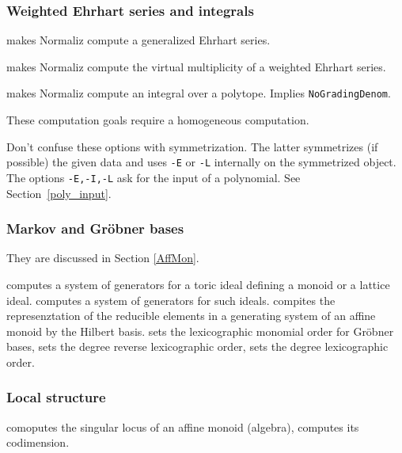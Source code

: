 \subsubsection{Weighted Ehrhart series and integrals}

\begin{itemize}
	
	\itemtt[WeightedEhrhartSeries, -E] makes Normaliz compute a generalized Ehrhart series.
	
	\itemtt[VirtualMultiplicity, -L] makes Normaliz compute the virtual multiplicity of a weighted Ehrhart series.
	
	\itemtt[Integral, -I] makes Normaliz compute an integral over a polytope. Implies \verb|NoGradingDenom|.
\end{itemize}

These computation goals require a homogeneous computation.

Don't confuse these options with symmetrization. The latter symmetrizes (if possible) the given data and uses \verb|-E| or \verb|-L| internally on the symmetrized object. The options \verb|-E,-I,-L| ask for the input of a polynomial. See Section~\ref{poly_input}.

\subsubsection{Markov and Gröbner bases}

They are discussed in Section \ref{AffMon}.
\begin{itemize}
	\itemtt[MarkovBasis] computes a system of generators for a toric ideal defining a monoid or a lattice ideal. 
	\itemtt[GroebnerBasis] computes a system of generators for such ideals.
	\itemtt[Representations] compites the represenztation of the reducible elements in a generating system of an affine monoid by the Hilbert basis.
	\itemtt[Lex] sets the lexicographic monomial order for Gröbner bases,
	\itemtt[RevLex] sets the degree reverse lexicographic order,
	\itemtt[DegLex] sets the degree lexicographic order.
\end{itemize}

\subsubsection{Local structure}

\begin{itemize}
	\itemtt[SingularLocus] comoputes the singular locus of an affine monoid (algebra),
	\itemtt[CodimSingularLocus] computes its codimension. 
\end{itemize}

